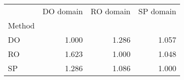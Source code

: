 \begin{tabular}{lrrr}
\toprule
{} &  DO domain &  RO domain &  SP domain \\
Method &            &            &            \\
\midrule
DO     &      1.000 &      1.286 &      1.057 \\
RO     &      1.623 &      1.000 &      1.048 \\
SP     &      1.286 &      1.086 &      1.000 \\
\bottomrule
\end{tabular}
